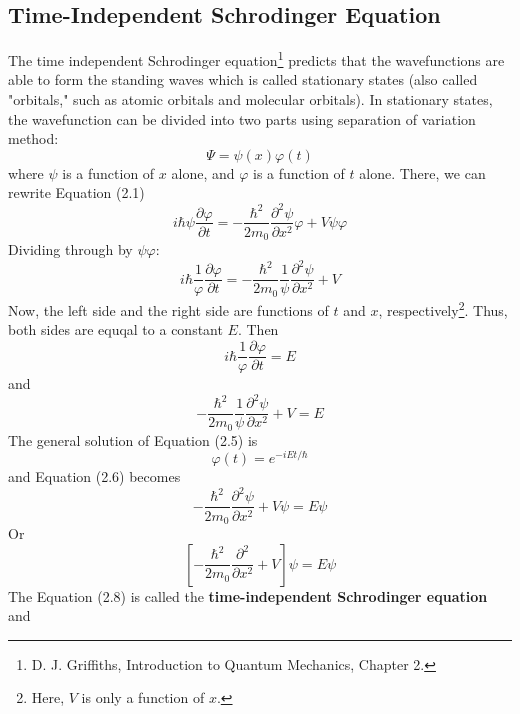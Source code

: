 \subsection{Time-Independent Schrodinger Equation}
The time independent Schrodinger equation\footnote{D. J. Griffiths, Introduction to Quantum Mechanics, Chapter 2.} predicts that the wavefunctions are able to form the standing waves which is called stationary states (also called "orbitals," such as atomic orbitals and molecular orbitals). In stationary states, the wavefunction can be divided into two parts using separation of variation method: \begin{equation}
    \Psi = \psi\left(x\right) \varphi\left(t\right)
\end{equation} where $\psi$ is a function of $x$ alone, and $\varphi$ is a function of $t$ alone. There, we can rewrite Equation (2.1) \begin{equation}
    i\hbar\psi\frac{\partial \varphi}{\partial t} = -\frac{\hbar^{2}}{2m_{0}}\frac{\partial^{2}\psi}{\partial x^{2}}\varphi + V\psi\varphi
\end{equation} Dividing through by $\psi\varphi$: \begin{equation}
    i\hbar\frac{1}{\varphi}\frac{\partial \varphi}{\partial t} = -\frac{\hbar^{2}}{2m_{0}}\frac{1}{\psi}\frac{\partial^{2}\psi}{\partial x^{2}} + V
\end{equation} Now, the left side and the right side are functions of $t$ and $x$, respectively\footnote{Here, $V$ is only a function of $x$.}. Thus, both sides are equqal to a constant $E$. Then \begin{equation}
    i\hbar\frac{1}{\varphi}\frac{\partial \varphi}{\partial t} = E
\end{equation} and \begin{equation}
    -\frac{\hbar^{2}}{2m_{0}}\frac{1}{\psi}\frac{\partial^{2}\psi}{\partial x^{2}} + V = E
\end{equation} The general solution of Equation (2.5) is \begin{equation}
    \varphi\left(t\right) = e^{-iEt/\hbar}
\end{equation} and Equation (2.6) becomes \begin{equation}
    -\frac{\hbar^{2}}{2m_{0}}\frac{\partial^{2}\psi}{\partial x^{2}} + V\psi = E\psi \nonumber
\end{equation} Or \begin{equation}
    \boxed{\left[-\frac{\hbar^{2}}{2m_{0}}\frac{\partial^{2}}{\partial x^{2}} + V\right]\psi = E\psi}
\end{equation} The Equation (2.8) is called the {\bf time-independent Schrodinger equation} and \begin{equation}

\end{equation}
